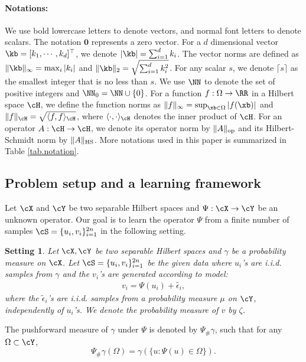 \documentclass[11pt]{article} %
\newtheorem{setting}{Setting}
\begin{document}
\paragraph{Notations:} We use bold lowercase letters to denote vectors, and normal font letters to denote scalars. The notation $\mathbf{0}$ represents a zero vector. For a $d$ dimensional vector $\kb=[
	k_1, \cdots , k_d]^{\top}$, we denote $|\kb|=\sum_{i=1}^d k_i$. The vector norms are defined as $\|\kb\|_{\infty}=\max_i |k_i|$ and $\|\kb\|_2=\sqrt{\sum_{i=1}^d k_i^2}$. For any scalar $s$, we denote $\lceil s \rceil$ as the smallest integer that is no less than $s$. We use $\NN$ to denote the set of positive integers and $\NN_0=\NN \cup \{0\}$. For a function $f: \Omega \rightarrow \RR$ in a Hilbert space $\cH$, we define the function norms as $\|f\|_{\infty}=\sup_{\xb\in\Omega} |f(\xb)|$ and $\|f\|_{\cH}=\sqrt{\langle f, f\rangle_{\cH}}$, where $\langle\cdot,\cdot\rangle_{\cH}$ denotes the inner product of $\cH$. For an operator $A: \cH\rightarrow \cH$, we denote its operator norm by $\|A\|_{\rm op}$ and its Hilbert-Schmidt norm by $\|A\|_{\rm HS}$. More notations used in this paper is summarized in Table \ref{tab.notation}.
	

\subsection{Problem setup and a learning framework}

Let $\cX$ and $\cY$ be two separable Hilbert spaces and $\Psi:\cX\rightarrow\cY$ be an unknown operator. Our goal is to learn the operator $\Psi$ from a finite number of samples  $\cS=\{u_i,v_i\}_{i=1}^{2n}$ in the following setting.

\begin{setting}\label{setting}
	Let $\cX,\cY$ be two separable Hilbert spaces and $\gamma$ be a probability measure on $\cX$. Let $\cS=\{u_i,v_i\}_{i=1}^{2n}$ be the given data where $u_i$'s are i.i.d. samples from $\gamma$ and the $v_i$'s are generated according to model:
	\begin{align}
	v_i = \Psi(u_i)+\widetilde{\epsilon_i},
	\label{eq.v}
\end{align}
where the $\widetilde{\epsilon}_i$'s are i.i.d. samples from a probability measure $\mu$ on $\cY$, independently of $u_i$'s. We denote the probability measure of $v$ by $\zeta$.
\end{setting}
The pushforward measure of $\gamma$ under $\Psi$ is denoted by $\Psi_{\#}\gamma$, such that for any $\Omega \subset\cY$,
$$
\Psi_{\#}\gamma(\Omega)=\gamma\left(\{u: \Psi(u)\in\Omega\}\right).
$$
\end{document}
